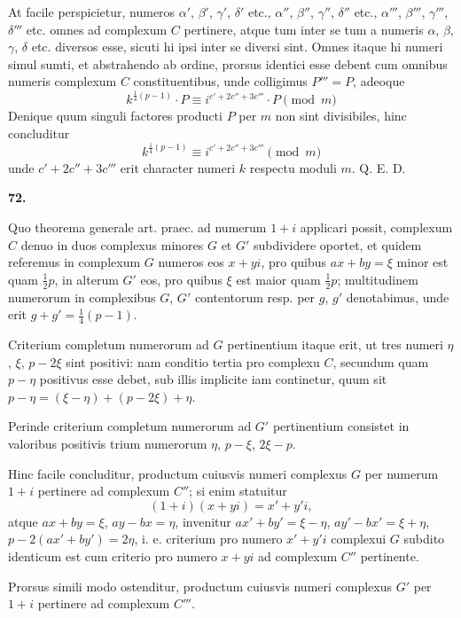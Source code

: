 \documentclass[12pt,a4paper]{article}
\theoremstyle{plain}
\theoremstyle{definition}
\theoremstyle{remark}
\begin{document}
At facile perspicietur, numeros $\alpha'$, $\beta'$, $\gamma'$, $\delta'$ etc., $\alpha''$, $\beta''$, $\gamma''$, $\delta''$ etc., $\alpha'''$, $\beta'''$, $\gamma'''$, $\delta'''$ etc. omnes ad complexum $C$ pertinere, atque tum inter se tum a numeris $\alpha$, $\beta$, $\gamma$, $\delta$ etc. diversos esse, sicuti hi ipsi inter se diversi sint. Omnes itaque hi numeri simul sumti, et abstrahendo ab ordine, prorsus identici esse debent cum omnibus numeris complexum $C$ constituentibus, unde colligimus $P''' = P$, adeoque
\[
k^{\frac{1}{4}(p-1)} \cdot P \equiv i^{c' + 2c'' + 3c'''} \cdot P \pmod{m}
\]
Denique quum singuli factores producti $P$ per $m$ non sint divisibiles, hinc concluditur
\[
k^{\frac{1}{4}(p-1)} \equiv i^{c' + 2c'' + 3c'''} \pmod{m}
\]
unde $c' + 2c'' + 3c'''$ erit character numeri $k$ respectu moduli $m$. Q. E. D.

\bigskip

\noindent\textbf{72.}

Quo theorema generale art. praec. ad numerum $1+i$ applicari possit, complexum $C$ denuo in duos complexus minores $G$ et $G'$ subdividere oportet, et quidem referemus in complexum $G$ numeros eos $x+yi$, pro quibus $ax+by = \xi$ minor est quam $\frac{1}{2}p$, in alterum $G'$ eos, pro quibus $\xi$ est maior quam $\frac{1}{2}p$; multitudinem numerorum in complexibus $G$, $G'$ contentorum resp. per $g$, $g'$ denotabimus, unde erit $g + g' = \frac{1}{4}(p-1)$.

Criterium completum numerorum ad $G$ pertinentium itaque erit, ut tres numeri $\eta$, $\xi$, $p - 2\xi$ sint positivi: nam conditio tertia pro complexu $C$, secundum quam $p - \eta$ positivus esse debet, sub illis implicite iam continetur, quum sit $p - \eta = (\xi - \eta) + (p - 2\xi) + \eta$.

Perinde criterium completum numerorum ad $G'$ pertinentium consistet in valoribus positivis trium numerorum $\eta$, $p - \xi$, $2\xi - p$.

Hinc facile concluditur, productum cuiusvis numeri complexus $G$ per numerum $1+i$ pertinere ad complexum $C''$; si enim statuitur
\[
(1+i)(x+yi) = x' + y'i,
\]
atque $ax+by = \xi$, $ay-bx = \eta$, invenitur $ax'+by' = \xi - \eta$, $ay'-bx' = \xi + \eta$, $p - 2(ax'+by') = 2\eta$, i. e. criterium pro numero $x'+y'i$ complexui $G$ subdito identicum est cum criterio pro numero $x+yi$ ad complexum $C''$ pertinente.

Prorsus simili modo ostenditur, productum cuiusvis numeri complexus $G'$ per $1+i$ pertinere ad complexum $C'''$.
\end{document}
